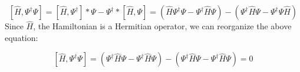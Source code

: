 \begin{equation}
\left[ \hat{H}, \Psi^{\dagger} \Psi \right]
=
\left[ \hat{H}, \Psi^{\dagger} \right] * \Psi
-
\Psi^{\dagger} * \left[ \hat{H}, \Psi \right]
=
\left(
\hat{H} \Psi^{\dagger} \Psi - \Psi^{\dagger} \hat{H} \Psi
\right)
-
\left(
\Psi^{\dagger} \hat{H} \Psi - \Psi^{\dagger} \Psi \hat{H} \right)
\end{equation}
Since $\hat{H}$, the Hamiltonian is a Hermitian operator, we can reorganize the above equation:

\begin{equation}
\left[ \hat{H}, \Psi^{\dagger} \Psi \right]
=
\left(
\Psi^{\dagger} \hat{H} \Psi - \Psi^{\dagger} \hat{H} \Psi
\right)
-
\left(
\Psi^{\dagger} \hat{H} \Psi - \Psi^{\dagger} \hat{H} \Psi \right)
=
0
\end{equation}